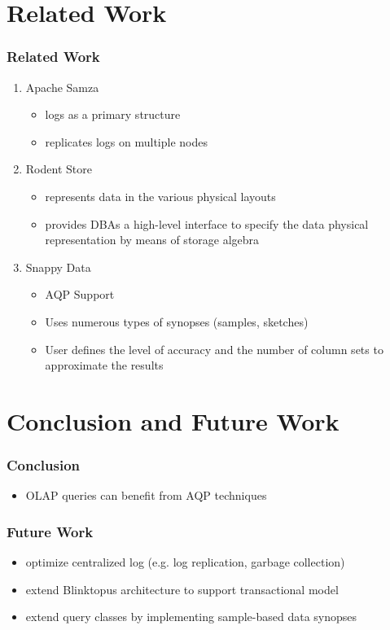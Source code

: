 \documentclass{beamer}
\begin{document}
\section{Related Work}
\begin{frame}
\frametitle{Related Work}
\begin{enumerate}
\item{Apache Samza}
\begin{itemize}
\item{logs as a primary structure}
\item{replicates logs on multiple nodes}
\end{itemize}
\item{Rodent Store}
\begin{itemize}
\item{represents data in the various physical layouts}
\item{provides DBAs a high-level interface to specify the data physical representation by means of storage algebra}
\end{itemize}
\item{Snappy Data}
\begin{itemize}
\item{AQP Support}
\item{Uses numerous types of synopses (samples, sketches)}
\item{User defines the level of accuracy and the number of column sets to approximate the results}
\end{itemize}
\end{enumerate}
\end{frame}

\section{Conclusion and Future Work}
\begin{frame}
\frametitle{Conclusion}
\begin{itemize}
\item{OLAP queries can benefit from AQP techniques}
\end{itemize}
\end{frame}

\begin{frame}
\frametitle{Future Work}
\begin{itemize}
\item{optimize centralized log (e.g. log replication, garbage collection)}
\item{extend Blinktopus architecture to support transactional model}
\item{extend query classes by implementing sample-based data synopses}
\end{itemize}
\end{frame}
\end{document}
